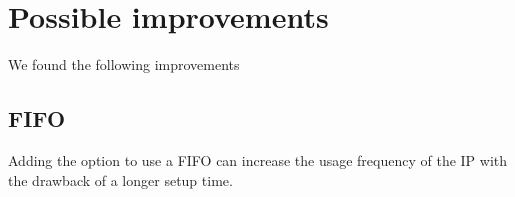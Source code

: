 \newpage

\section{Possible improvements}

We found the following improvements

\subsection{FIFO}

Adding the option to use a FIFO can increase the usage frequency of the IP with the drawback of a longer setup time. 
